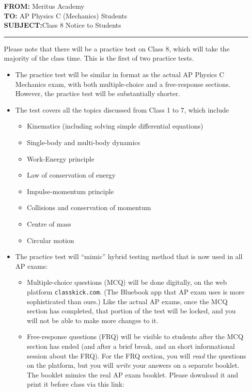 \documentclass[letterpaper,11pt]{article}
\begin{document}
{\large
  \textbf{FROM:}\tabto{1.3in} Meritus Academy\\
  \textbf{TO:}\tabto{1.3in} AP Physics C (Mechanics) Students\\
  \textbf{SUBJECT:}\tabto{1.3in}Class 8 Notice to Students
  \par
}
\vspace{.2in}\hrule

Please note that there will be a practice test on Class 8, which will take the
majority of the class time. This is the first of two practice tests.

\begin{itemize}[itemsep=4pt,topsep=0pt,leftmargin=15pt]
\item The practice test will be similar in format as the actual AP Physics C
  Mechanics exam, with both multiple-choice and a free-response sections.
  However,   the practice test will be substantially shorter.
  
\item The test covers all the topics discussed from Class 1 to 7, which
  include
  \begin{itemize}
  \item Kinematics (including solving simple differential equations)
  \item Single-body and multi-body dynamics
  \item Work-Energy principle
  \item Law of conservation of energy
  \item Impulse-momentum principle
  \item Collisions and conservation of momentum
  \item Centre of mass
  \item Circular motion
  \end{itemize}

\item The practice test will ``mimic'' hybrid testing method that is now used
  in all AP exams:
  \begin{itemize}
  \item Multiple-choice questions (MCQ) will be done digitally, on the web
    platform \texttt{classkick.com}. (The Bluebook app that AP exam uses is
    more sophisticated than ours.) Like the actual AP exams, once the MCQ
    section has completed, that portion of the test will be locked, and you
    will not be able to make more changes to it.
    
  \item Free-response questions (FRQ) will be visible to students after the
    MCQ section has ended (and after a brief break, and an short informational
    session about the FRQ). For the FRQ section, you
    will \emph{read} the questions on the platform, but you will \emph{write}
    your answers on a separate booklet. The booklet mimics the real AP exam
    booklet. Please download it and print it before class via this link:


\end{itemize}
\end{itemize}
\end{document}
